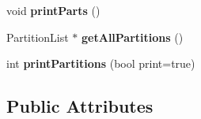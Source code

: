 \begin{DoxyCompactItemize}
\item 
\hypertarget{classDatatree_a3fb38bb2c99eaa53609eff28b1640ed4}{void {\bfseries print\-Parts} ()}\label{classDatatree_a3fb38bb2c99eaa53609eff28b1640ed4}

\item 
\hypertarget{classDatatree_a4e27d38736e49ceb96158a9e888a0a2e}{Partition\-List $\ast$ {\bfseries get\-All\-Partitions} ()}\label{classDatatree_a4e27d38736e49ceb96158a9e888a0a2e}

\item 
\hypertarget{classDatatree_a989234f1c876c6a27474d6340190e4b5}{int {\bfseries print\-Partitions} (bool print=true)}\label{classDatatree_a989234f1c876c6a27474d6340190e4b5}

\end{DoxyCompactItemize}
\subsection*{Public Attributes}
